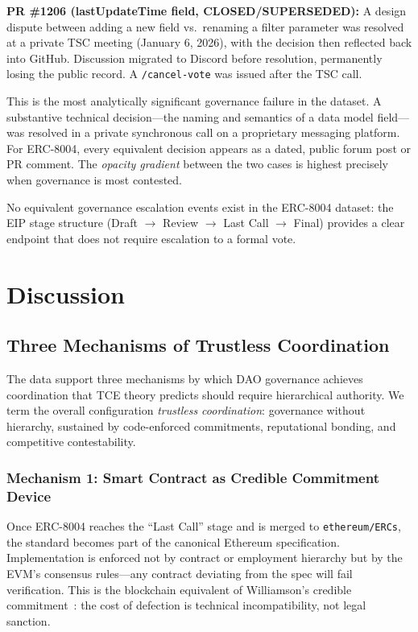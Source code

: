 \documentclass[conference]{IEEEtran}
\begin{document}
\textbf{PR \#1206 (lastUpdateTime field, CLOSED/SUPERSEDED):} A design
dispute between adding a new field vs.\ renaming a filter parameter was
resolved at a private TSC meeting (January 6, 2026), with the decision
then reflected back into GitHub. Discussion migrated to Discord before
resolution, permanently losing the public record. A \texttt{/cancel-vote}
was issued after the TSC call.

This is the most analytically significant governance failure in the
dataset. A substantive technical decision---the naming and semantics
of a data model field---was resolved in a private synchronous call on
a proprietary messaging platform. For ERC-8004, every equivalent
decision appears as a dated, public forum post or PR comment. The
\textit{opacity gradient} between the two cases is highest precisely
when governance is most contested.

No equivalent governance escalation events exist in the ERC-8004 dataset:
the EIP stage structure (Draft $\to$ Review $\to$ Last Call $\to$ Final)
provides a clear endpoint that does not require escalation to a formal vote.


\section{Discussion}

\subsection{Three Mechanisms of Trustless Coordination}

The data support three mechanisms by which DAO governance achieves
coordination that TCE theory predicts should require hierarchical authority.
We term the overall configuration \textit{trustless coordination}: governance
without hierarchy, sustained by code-enforced commitments, reputational
bonding, and competitive contestability.

\subsubsection{Mechanism 1: Smart Contract as Credible Commitment Device}

Once ERC-8004 reaches the ``Last Call'' stage and is merged to
\texttt{ethereum/ERCs}, the standard becomes part of the canonical Ethereum
specification. Implementation is enforced not by contract or employment
hierarchy but by the EVM's consensus rules---any contract deviating from
the spec will fail verification. This is the blockchain equivalent of
Williamson's credible commitment~\cite{williamson1983}: the cost of defection
is technical incompatibility, not legal sanction.
\end{document}
